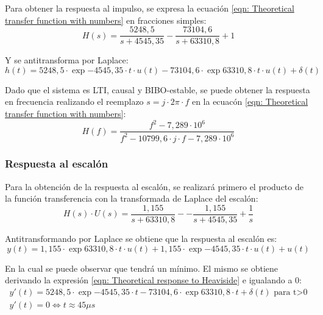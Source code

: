 Para obtener la respuesta al impulso, se expresa la ecuaci\'on \ref{eqn: Theoretical transfer function with numbers} en fracciones simples:
\begin{equation}
    H(s) = \frac{5248,5}{s+4545,35} - \frac{73104,6}{s+63310,8} + 1
\end{equation}

Y se antitransforma por Laplace:
\begin{equation}
    \label{eqn: Theoretical impulse response}
    h(t) = 5248,5 \cdot \exp{-4545,35 \cdot t} \cdot u(t) - 73104,6 \cdot \exp{63310,8 \cdot t} \cdot u(t) + \delta(t)
\end{equation}

Dado que el sistema es LTI, causal y BIBO-estable, se puede obtener la respuesta en frecuencia realizando el reemplazo $s = j \cdot 2\pi \cdot f$ en la ecuac\'on \ref{eqn: Theoretical transfer function with numbers}:
\begin{equation}
    \label{eqn: Theoretical frequency response}
    H(f) = \frac{f^2 - 7,289 \cdot 10^6}{f^2 - 10799,6 \cdot j \cdot f - 7,289 \cdot 10^6}
\end{equation}



\subsubsection{Respuesta al escal\'on}
Para la obtenci\'on de la respuesta al escal\'on, se realizar\'a primero el producto de la funci\'on transferencia con la transformada de Laplace del escal\'on:
\begin{equation}
    H(s) \cdot U(s) = \frac{1,155}{s+63310,8} -  - \frac{1,155}{s+4545,35} + \frac{1}{s}
\end{equation} 

Antitransformando por Laplace se obtiene que la respuesta al escal\'on es:
\begin{equation}
    \label{eqn: Theoretical response to Heaviside}
    y(t) = 1,155 \cdot \exp{63310,8 \cdot t} \cdot u(t) + 1,155 \cdot \exp{-4545,35 \cdot t} \cdot u(t) + u(t)
\end{equation}

En la cual se puede observar que tendr\'a un m\'inimo. El mismo se obtiene derivando la expresi\'on \ref{eqn: Theoretical response to Heaviside} e igualando a 0:
\begin{align}
    y'(t) = 5248,5 \cdot \exp{-4545,35 \cdot t} - 73104,6 \cdot \exp{63310,8 \cdot t} + \delta(t)\textrm{      para t>0} \\
    y'(t) = 0 \iff t \approx 45 \mu s
\end{align}



